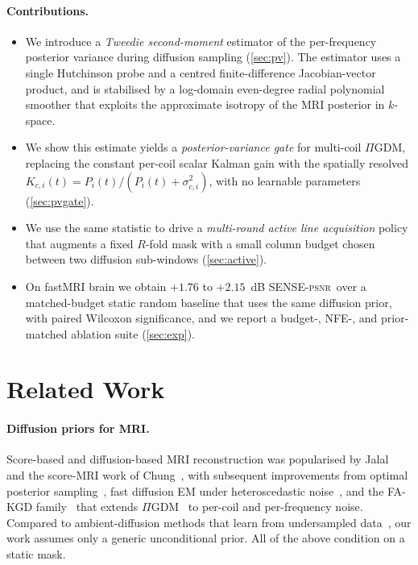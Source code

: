 \documentclass[conference]{IEEEtran}
\newcommand{\PSNR}{\textsc{psnr}}
\newcommand{\PIGDM}{$\Pi$GDM}
\begin{document}
\paragraph{Contributions.}
\begin{itemize}
  \item We introduce a \emph{Tweedie second-moment} estimator of the
        per-frequency posterior variance during diffusion sampling
        (\cref{sec:pv}). The estimator uses a single Hutchinson probe
        and a centred finite-difference Jacobian-vector product, and
        is stabilised by a log-domain even-degree radial polynomial
        smoother that exploits the approximate isotropy of the MRI
        posterior in $k$-space.
  \item We show this estimate yields a \emph{posterior-variance gate}
        for multi-coil \PIGDM, replacing the constant per-coil scalar
        Kalman gain with the spatially resolved
        $K_{c,i}(t){=}P_i(t)/(P_i(t){+}\sigma_{c,i}^{2})$, with no
        learnable parameters (\cref{sec:pvgate}).
  \item We use the same statistic to drive a \emph{multi-round active
        line acquisition} policy that augments a fixed $R$-fold mask
        with a small column budget chosen between two diffusion
        sub-windows (\cref{sec:active}).
  \item On fastMRI brain we obtain $+1.76$ to $+2.15$~dB
        SENSE-\PSNR\ over a matched-budget static random baseline that
        uses the same diffusion prior, with paired Wilcoxon
        significance, and we report a budget-, NFE-, and
        prior-matched ablation suite (\cref{sec:exp}).
\end{itemize}

\section{Related Work}\label{sec:related}

\paragraph{Diffusion priors for MRI.} Score-based and diffusion-based
MRI reconstruction was popularised by Jalal~\cite{jalal2021robust} and
the score-MRI work of Chung~\cite{chung2022scoremri}, with subsequent
improvements from optimal posterior
sampling~\cite{peng2024optimal}, fast diffusion EM under
heteroscedastic noise~\cite{laroche2024fastdiffem}, and the FA-KGD
family~\cite{ours2025} that extends \PIGDM~\cite{song2023pigdm} to
per-coil and per-frequency noise. Compared to ambient-diffusion
methods that learn from undersampled data~\cite{daras2025ambient}, our
work assumes only a generic unconditional prior. All of the above
condition on a static mask.
\end{document}
